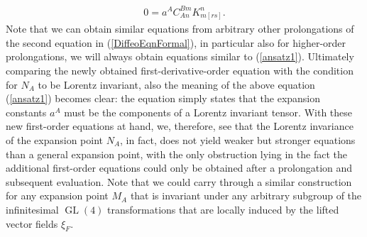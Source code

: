 \begin{align}\label{ansatz1}
    0 = a^A C^{Bm}_{An}  K_{m[rs]}^n.
\end{align}
Note that we can obtain similar equations from arbitrary other prolongations of the second equation in (\ref{DiffeoEqnFormal}), in particular also for higher-order prolongations, we will always obtain equations similar to (\ref{ansatz1}). Ultimately comparing the newly obtained first-derivative-order equation with the condition for $N_A$ to be Lorentz invariant, also the meaning of the above equation (\ref{ansatz1}) becomes clear: the equation simply states that the expansion constants $a^A$ must be the components of a Lorentz invariant tensor. With these new first-order equations at hand, we, therefore, see that the Lorentz invariance of the expansion point $N_A$, in fact, does not yield weaker but stronger equations than a general expansion point, with the only obstruction lying in the fact the additional first-order equations could only be obtained after a prolongation and subsequent evaluation. Note that we could carry through a similar construction for any expansion point $M_A$ that is invariant under any arbitrary subgroup of the infinitesimal $\operatorname{GL}(4)$ transformations that are locally induced by the lifted vector fields $\xi_F$. 

